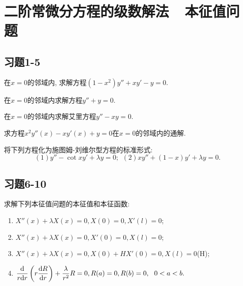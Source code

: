 

\chapter{二阶常微分方程的级数解法~~本征值问题}

\section{习题1-5}

\begin{yyEx}
	在$x = 0$的邻域内, 求解方程$(1-x^2)y''+xy'-y = 0$.
\end{yyEx}

\begin{yyEx}
	在$x = 0$的邻域内求解方程$y'' + y = 0$.
\end{yyEx}

\begin{yyEx}
	在$x = 0$的邻域内求解艾里方程$y'' - xy = 0$.
\end{yyEx}

\begin{yyEx}
	求方程$x^2y''(x)-xy'(x)+y = 0$在$x = 0$的邻域内的通解.
\end{yyEx}

\begin{yyEx}
	将下列方程化为施图姆-刘维尔型方程的标准形式:
	\begin{equation*}
		(1)y''-\cot xy'+\lambda y = 0;~~(2) xy''+(1-x)y'+\lambda y = 0.
	\end{equation*}
\end{yyEx}

\section{习题6-10}

\begin{yyEx}
	求解下列本征值问题的本征值和本征函数:
	\begin{enumerate}
		\item $X''(x) + \lambda X(x) = 0, X(0) = 0 , X'(l) = 0$;\\
		\item $X''(x) + \lambda X(x) = 0, X'(0) = 0 , X(l) = 0$;\\
		\item $X''(x) + \lambda X(x) = 0, X(0)+HX'(0) = 0 , X(l) = 0$(H);\\
		\item $\begin{lgathered}
			\frac{\mathrm{d}}{r\mathrm{d}r}\left( r\frac{\mathrm{d}R}{\mathrm{d}r} \right)+\frac{\lambda}{r^2}R = 0,R(a) = 0,R(b) = 0,~~0<a<b.
		\end{lgathered}$
	\end{enumerate}
\end{yyEx}


